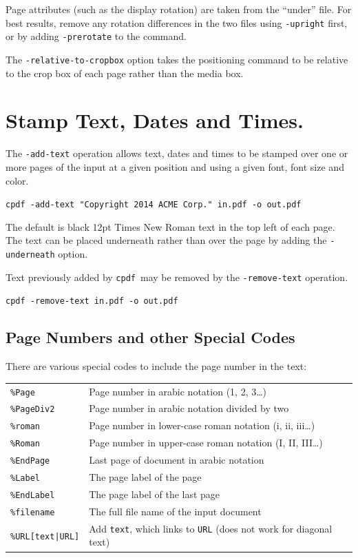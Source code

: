 \documentclass{book}
\newcommand{\cpdf}{\texttt{cpdf}}
\begin{document}
\noindent Page attributes (such as the display rotation) are taken from the ``under''
file. For best results, remove any rotation differences in the two files using
\texttt{-upright} first, or by adding \texttt{-prerotate} to the command.

The \texttt{-relative-to-cropbox} option takes the positioning command to be relative to the crop box of each page rather than the media box.

  \section{Stamp Text, Dates and Times.}
  The \texttt{-add-text} operation allows text, dates and times to be stamped
over one or more pages of the input at a given position and using a given font,
font size and color.
  \begin{framed}
    \noindent\small\verb!cpdf -add-text "Copyright 2014 ACME Corp." in.pdf -o out.pdf!
  \end{framed}
  \noindent The default is black 12pt Times New Roman text in the top left of each page. The text can be placed underneath rather than over the page by adding the \texttt{-underneath} option.
  
  Text previously added by \cpdf\ may be removed by the \texttt{-remove-text} operation.
  \begin{framed}
    \noindent\small\verb!cpdf -remove-text in.pdf -o out.pdf!
  \end{framed}

  \subsection{Page Numbers and other Special Codes}
  There are various special codes to include the page number in the text:

  \vspace{2mm}
  \begin{tabular}{ll}
    \texttt{\%Page} & Page number in arabic notation (1, 2, 3\ldots) \\
    \texttt{\%PageDiv2} & Page number in arabic notation divided by two \\
    \texttt{\%roman} & Page number in lower-case roman notation (i, ii, iii\ldots) \\
    \texttt{\%Roman} & Page number in upper-case roman notation (I, II, III\ldots) \\
    \texttt{\%EndPage} & Last page of document in arabic notation \\
    \texttt{\%Label} & The page label of the page \\
    \texttt{\%EndLabel} & The page label of the last page \\
    \texttt{\%filename} & The full file name of the input document \\
    \texttt{\%URL[text|URL]} & Add \texttt{text}, which links to \texttt{URL} (does not work for diagonal text)
  \end{tabular}
\end{document}
